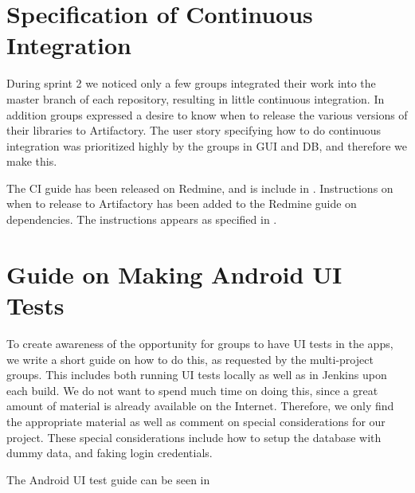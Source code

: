 \section{Specification of Continuous Integration}
During sprint 2 we noticed only a few groups integrated their work into the master branch of each repository, resulting in little continuous integration. In addition groups expressed a desire to know when to release the various versions of their libraries to Artifactory. The user story specifying how to do continuous integration was prioritized highly by the groups in GUI and DB, and therefore we make this.

The CI guide has been released on Redmine, and is include in . Instructions on when to release to Artifactory has been added to the Redmine guide on dependencies. The instructions appears as specified in .

\section{Guide on Making Android UI Tests}
To create awareness of the opportunity for groups to have UI tests in the apps, we write a short guide on how to do this, as requested by the multi-project groups. This includes both running UI tests locally as well as in Jenkins upon each build. We do not want to spend much time on doing this, since a great amount of material is already available on the Internet. Therefore, we only find the appropriate material as well as comment on special considerations for our project. These special considerations include how to setup the database with dummy data, and faking login credentials.

The Android UI test guide can be seen in 